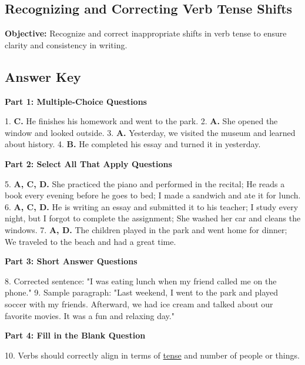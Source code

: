 \documentclass[12pt]{article}
\begin{document}
\subsection*{Recognizing and Correcting Verb Tense Shifts}
\onehalfspacing

\begin{tcolorbox}[colframe=black!40, colback=gray!0, title=Learning Objective]
\textbf{Objective:} Recognize and correct inappropriate shifts in verb tense to ensure clarity and consistency in writing.
\end{tcolorbox}


\subsection*{Answer Key}

\textbf{Part 1: Multiple-Choice Questions}

1. \textbf{C.} He finishes his homework and went to the park.  
2. \textbf{A.} She opened the window and looked outside.  
3. \textbf{A.} Yesterday, we visited the museum and learned about history.  
4. \textbf{B.} He completed his essay and turned it in yesterday.  

\textbf{Part 2: Select All That Apply Questions}

5. \textbf{A, C, D.} She practiced the piano and performed in the recital; He reads a book every evening before he goes to bed; I made a sandwich and ate it for lunch.  
6. \textbf{A, C, D.} He is writing an essay and submitted it to his teacher; I study every night, but I forgot to complete the assignment; She washed her car and cleans the windows.  
7. \textbf{A, D.} The children played in the park and went home for dinner; We traveled to the beach and had a great time.  

\textbf{Part 3: Short Answer Questions}

8. Corrected sentence: "I was eating lunch when my friend called me on the phone."  
9. Sample paragraph: "Last weekend, I went to the park and played soccer with my friends. Afterward, we had ice cream and talked about our favorite movies. It was a fun and relaxing day."  

\textbf{Part 4: Fill in the Blank Question}

10. Verbs should correctly align in terms of \underline{tense} and number of people or things.
\end{document}
